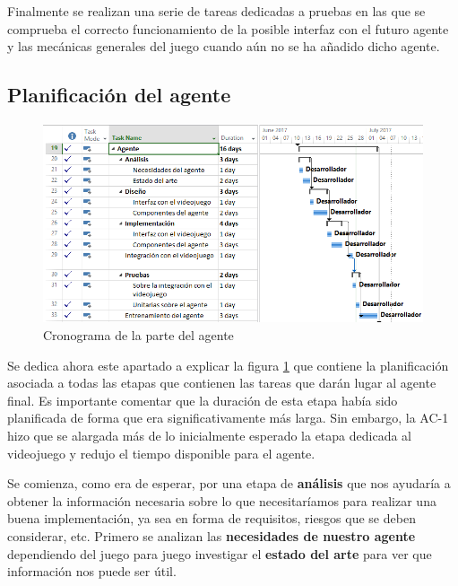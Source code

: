 \bigskip

Finalmente se realizan una serie de tareas dedicadas a pruebas en las que se comprueba el correcto funcionamiento de la posible interfaz con el futuro agente y las mecánicas generales del juego cuando aún no se ha añadido dicho agente.


\subsection{Planificación del agente}

\begin{figure}
	\centerline{\includegraphics[width=19cm]{otros/capturasPlanificacion/agente.PNG}}
	\caption{Cronograma de la parte del agente}
	\label{plan:agente}
\end{figure}

Se dedica ahora este apartado a explicar la figura \ref{plan:agente} que contiene la planificación asociada a todas las etapas que contienen las tareas que darán lugar al agente final. Es importante comentar que la duración de esta etapa había sido planificada de forma que era significativamente más larga. Sin embargo, la AC-1 hizo que se alargada más de lo inicialmente esperado la etapa dedicada al videojuego y redujo el tiempo disponible para el agente.


\bigskip

Se comienza, como era de esperar, por una etapa de \textbf{análisis} que nos ayudaría a obtener la información necesaria sobre lo que necesitaríamos para realizar una buena implementación, ya sea en forma de requisitos, riesgos que se deben considerar, etc. Primero se analizan las \textbf{necesidades de nuestro agente} dependiendo del juego para juego investigar el \textbf{estado del arte} para ver que información nos puede ser útil.

\bigskip

